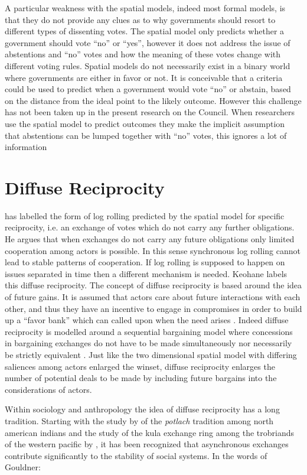 A particular weakness with the spatial models, indeed most formal models, is that they do not provide any clues as to why governments should resort to different types of dissenting votes. The spatial model only predicts whether a government should vote ``no'' or ``yes'', however it does not address the issue of abstentions and ``no'' votes and how the meaning of these votes change with different voting rules. Spatial models do not necessarily exist in a binary world where governments are either in favor or not. It is conceivable that a criteria could be used to predict when a government would vote ``no'' or abstain, based on the distance from the ideal point to the likely outcome. However this challenge has not been taken up in the present research on the Council. When researchers use the spatial model to predict outcomes they make the implicit assumption that abstentions can be lumped together with ``no'' votes, this ignores a lot of information  

\section{Diffuse Reciprocity}

\citet{Keohane1986} has labelled the form of log rolling predicted  by the spatial model for specific reciprocity, i.e. an exchange of votes which do not carry any further obligations. He argues that when exchanges do not carry any future obligations only limited cooperation among actors is possible. In this sense synchronous log rolling cannot lead to stable patterns of cooperation. If log rolling is supposed to happen on issues separated in time then a different mechanism is needed. Keohane labels this diffuse reciprocity. The concept of diffuse reciprocity is based around the idea of future gains. It is assumed that actors care about future interactions with each other, and thus they have an incentive to engage in compromises in order to build up a ``favor bank'' which can called upon when the need arises \citep{Heisenberg2005}. Indeed diffuse reciprocity is modelled around a sequential bargaining model where concessions in bargaining exchanges do not have to be made simultaneously nor necessarily be strictly equivalent \citep{Jonsson2000}.  Just like the two dimensional spatial model with differing saliences among actors enlarged the winset, diffuse reciprocity enlarges the number of potential deals to be made by including future bargains into the considerations of actors. 

Within sociology and anthropology the idea of diffuse reciprocity has a long tradition. Starting with the study by \citet{Mauss1950} of the \textsl{potlach} tradition among north american indians and the study of the kula exchange ring among the trobriands of the western pacific by \citet{Malinowski1922}, it has been recognized that asynchronous exchanges contribute significantly to the stability of social systems. In the words of Gouldner:

